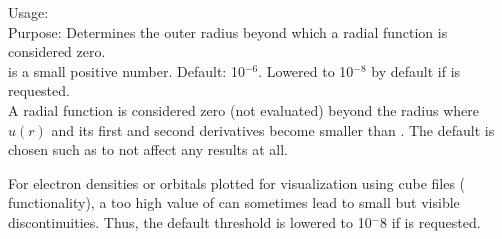 





{
  \noindent
  Usage:   \\[1.0ex]
  Purpose: Determines the outer radius beyond which a radial function
  is considered zero. \\[1.0ex]
   is a small positive number. Default: 10$^{-6}$.
  Lowered to 10$^{-8}$ by default if 
   is requested. \\ 
}
A radial function is considered zero (not evaluated) beyond the radius
where $u(r)$ and its first and second derivatives become smaller than
. The default is chosen such as to not affect any
results at all.

For electron densities or orbitals plotted for visualization using
cube files (  functionality), a too
high value of  can sometimes lead to small
but visible discontinuities. Thus, the default threshold is
lowered to 10$^-8$ if   is requested.


